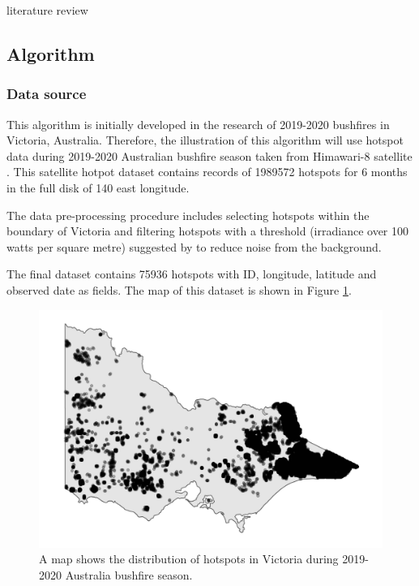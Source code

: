 literature review

\hypertarget{algorithm}{%
\subsection{Algorithm}\label{algorithm}}

\hypertarget{data-source}{%
\subsubsection{Data source}\label{data-source}}

This algorithm is initially developed in the research of 2019-2020
bushfires in Victoria, Australia. Therefore, the illustration of this
algorithm will use hotspot data during 2019-2020 Australian bushfire
season taken from Himawari-8 satellite \citep{jaxa}. This satellite
hotpot dataset contains records of 1989572 hotspots for 6 months in the
full disk of 140 \textdegree east longitude.

The data pre-processing procedure includes selecting hotspots within the
boundary of Victoria and filtering hotspots with a threshold (irradiance
over 100 watts per square metre) suggested by \citet{hotspots} to reduce
noise from the background.

The final dataset contains 75936 hotspots with ID, longitude, latitude
and observed date as fields. The map of this dataset is shown in Figure
\ref{fig:hotspots}.

\begin{Schunk}
\begin{figure}

{\centering \includegraphics[width=0.8\linewidth]{figures/before_clustering} 

}

\caption[A map shows the distribution of hotspots in Victoria during 2019-2020 Australia bushfire season]{A map shows the distribution of hotspots in Victoria during 2019-2020 Australia bushfire season.}\label{fig:hotspots}
\end{figure}
\end{Schunk}


